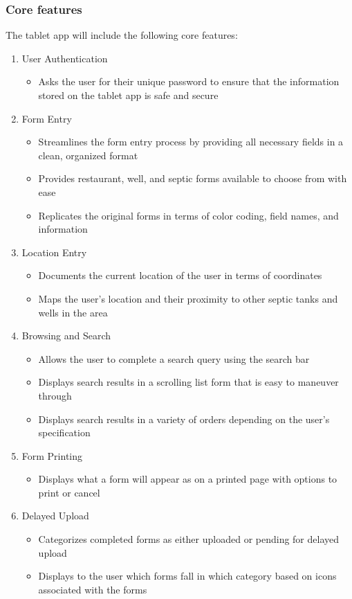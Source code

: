 \documentclass[twoside,letterpaper]{article}
\begin{document}
\subsubsection{Core features}
{\rmfamily\color{black}
The tablet app will include the following core features:
\begin{enumerate}
\item User Authentication
\begin{itemize}
\item Asks the user for their unique password to ensure that the information stored on the tablet app is safe and secure
\end{itemize}
\item Form Entry
\begin{itemize}
\item Streamlines the form entry process by providing all necessary fields in a clean, organized format
\item Provides restaurant, well, and septic forms available to choose from with ease
\item Replicates the original forms in terms of color coding, field names, and information
\end{itemize}
\item Location Entry
\begin{itemize}
\item Documents the current location of the user in terms of coordinates
\item Maps the user's location and their proximity to other septic tanks and wells in the area
\end{itemize}
\item Browsing and Search
\begin{itemize}
\item Allows the user to complete a search query using the search bar
\item Displays search results in a scrolling list form that is easy to maneuver through
\item Displays search results in a variety of orders depending on the user's specification
\newline\newline
\end{itemize}
\item Form Printing
\begin{itemize}
\item Displays what a form will appear as on a printed page with options to print or cancel
\end{itemize}
\item Delayed Upload
\begin{itemize}
\item Categorizes completed forms as either uploaded or pending for delayed upload
\item Displays to the user which forms fall in which category based on icons associated with the forms
\end{itemize}
\end{enumerate}
}
\end{document}
